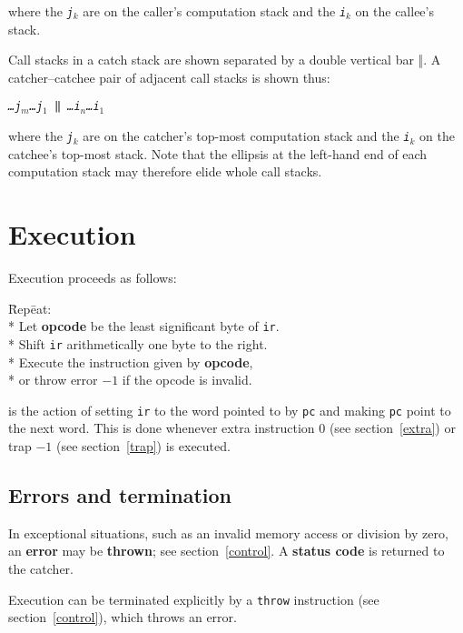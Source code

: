 \documentclass[a4paper]{article}
\newcommand{\spic}[1]{\texttt{\slshape{#1\/}}}
\begin{document}
\noindent where the \spic{j$_k$} are on the caller’s computation stack and the \spic{i$_k$} on the callee’s stack.

Call stacks in a catch stack are shown separated by a double vertical bar {\rm ‖}. A catcher–catchee pair of adjacent call stacks is shown thus:

\begin{center}
\spic{…j$_m$\dots j$_1$ {\rm ‖} …i$_n$\dots i$_1$}
\end{center}

\noindent where the \spic{j$_k$} are on the catcher’s top-most computation stack and the \spic{i$_k$} on the catchee’s top-most stack. Note that the ellipsis at the left-hand end of each computation stack may therefore elide whole call stacks.


\section{Execution}
\label{execution}

Execution proceeds as follows:

\begin{tabbing}
\hspace{0.2in}\=Rep\=eat:\+\+ \\*
Let \textbf{opcode} be the least significant byte of {\tt ir}. \\*
Shift {\tt ir} arithmetically one byte to the right. \\*
Execute the instruction given by \textbf{opcode}, \\*
\hspace{1em}or throw error $-1$ if the opcode is invalid. \-
\end{tabbing}

 is the action of setting {\tt ir} to the word pointed to by {\tt pc} and making {\tt pc} point to the next word. This is done whenever extra instruction $0$ (see section~\ref{extra}) or trap $-1$ (see section~\ref{trap}) is executed.


\subsection{Errors and termination}
\label{errors}

In exceptional situations, such as an invalid memory access or division by zero, an {\bf error} may be {\bf thrown}; see section~\ref{control}. A {\bf status code} is returned to the catcher.

Execution can be terminated explicitly by a {\tt throw} instruction (see section~\ref{control}), which throws an error.
\end{document}

